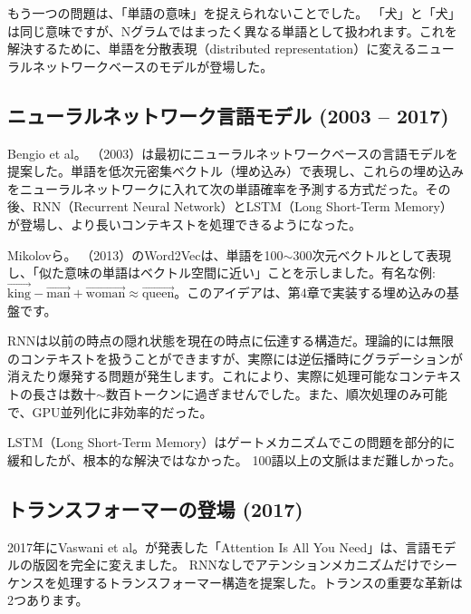 もう一つの問題は、「単語の意味」を捉えられないことでした。 「犬」と「犬」は同じ意味ですが、Nグラムではまったく異なる単語として扱われます。これを解決するために、単語を分散表現（distributed representation）に変えるニューラルネットワークベースのモデルが登場した。

\subsection{ニューラルネットワーク言語モデル (2003  --  2017)}

Bengio et al。 （2003）は最初にニューラルネットワークベースの言語モデルを提案した。単語を低次元密集ベクトル（埋め込み）で表現し、これらの埋め込みをニューラルネットワークに入れて次の単語確率を予測する方式だった。その後、RNN（Recurrent Neural Network）とLSTM（Long Short-Term Memory）が登場し、より長いコンテキストを処理できるようになった。

\begin{infobox}
Mikolovら。 （2013）のWord2Vecは、単語を100$\sim$300次元ベクトルとして表現し、「似た意味の単語はベクトル空間に近い」ことを示しました。有名な例:$\vec{\text{king}} - \vec{\text{man}} + \vec{\text{woman}} \approx \vec{\text{queen}}$。このアイデアは、第4章で実装する埋め込みの基盤です。
\end{infobox}

\begin{warnbox}[RNNの限界]
RNNは以前の時点の隠れ状態を現在の時点に伝達する構造だ。理論的には無限のコンテキストを扱うことができますが、実際には逆伝播時にグラデーションが消えたり爆発する問題が発生します。これにより、実際に処理可能なコンテキストの長さは数十$\sim$数百トークンに過ぎませんでした。また、順次処理のみ可能で、GPU並列化に非効率的だった。

LSTM（Long Short-Term Memory）はゲートメカニズムでこの問題を部分的に緩和したが、根本的な解決ではなかった。 100語以上の文脈はまだ難しかった。
\end{warnbox}

\subsection{トランスフォーマーの登場 (2017)}

2017年にVaswani et al。が発表した「Attention Is All You Need」は、言語モデルの版図を完全に変えました。 RNNなしでアテンションメカニズムだけでシーケンスを処理するトランスフォーマー構造を提案した。トランスの重要な革新は2つあります。

